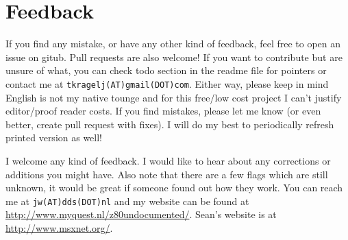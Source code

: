 \documentclass[12pt,twoside,openright,a4paper]{book}
\begin{document}
\section{Feedback}

\begin{description}[style=unboxed,leftmargin=0cm]

	\item[Tomaz]\hfill

	If you find any mistake, or have any other kind of feedback, feel free to open an issue on gitub. Pull requests are also welcome! If you want to contribute but are unsure of what, you can check todo section in the readme file for pointers or contact me at {\tt tkragelj(AT)gmail(DOT)com}. Either way, please keep in mind English is not my native tounge and for this free/low cost project I can't justify editor/proof reader costs. If you find mistakes, please let me know (or even better, create pull request with fixes). I will do my best to periodically refresh printed version as well!

	\item[Jan]\hfill
	
	I welcome any kind of feedback. I would like to hear about any corrections or additions you might have. Also note that there are a few flags which are still unknown, it would be great if someone found out how they work. You can reach me at {\tt jw(AT)dds(DOT)nl} and my website can be found at \url{http://www.myquest.nl/z80undocumented/}. Sean's website is at \url{http://www.msxnet.org/}.

\end{description}


\pagebreak
\end{document}
